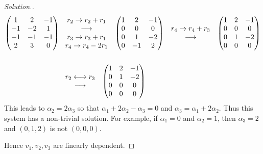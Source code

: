 \documentclass[11pt,a4paper]{article}
\theoremstyle{definition}
\newenvironment{solution}
  {\renewcommand{\qedsymbol}{}\begin{proof}[\textit{Solution}.]}
  {\end{proof}}
\begin{document}
\begin{solution}
\begin{align*}
\begin{pmatrix}
1&2&-1\\-1&-2&1\\-1&-1&-1\\2&3&0\\
\end{pmatrix}
& \hspace{0.3cm}
\begin{matrix}
r_2\rightarrow r_2+r_1\\ \longrightarrow \\ r_3\rightarrow r_3+r_1\\ r_4\rightarrow r_4-2r_1\\
\end{matrix}
\hspace{0.3cm}
\begin{pmatrix}
1&2&-1\\0&0&0\\0&1&-2\\0&-1&2\\
\end{pmatrix}
\hspace{0.3cm}
\begin{matrix}
r_4\rightarrow r_4+r_3\\ \longrightarrow\\
\end{matrix}
\hspace{0.3cm}
\begin{pmatrix}
1&2&-1\\0&0&0\\0&1&-2\\0&0&0\\
\end{pmatrix}\\\\
& \hspace{0.3cm}
\begin{matrix}
r_2\longleftrightarrow r_3\\ \longrightarrow\\
\end{matrix}
\hspace{0.3cm}
\begin{pmatrix}
1&2&-1\\0&1&-2\\0&0&0\\0&0&0\\
\end{pmatrix}
\end{align*}
This leads to $\alpha_2=2\alpha_3$ so that $\alpha_1+2\alpha_2-\alpha_3=0$ and $\alpha_3=\alpha_1+2\alpha_2$. Thus this system has a non-trivial solution. For example, if $\alpha_1=0$ and $\alpha_2=1$, then $\alpha_3=2$ and $(0,1,2)$ is not $(0,0,0)$.

Hence $v_1, v_2, v_3$ are linearly dependent.
\end{solution}
\end{document}
